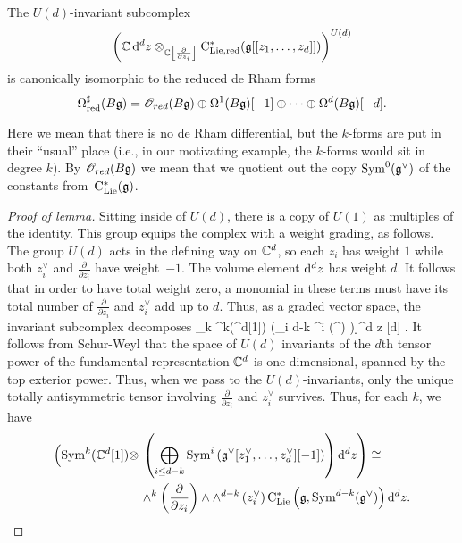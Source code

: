 \begin{lem}
The $U(d)$-invariant subcomplex 
\[
\left( \mathbb C \, {\rm d}^d z \otimes_{\mathbb C\left[\frac{\partial}{\partial z_i}\right]} {\rm C}_{\rm Lie, red}^*(\mathfrak g[[z_1,\ldots,z_d]]) \right)^{U(d)}
\]
is canonically isomorphic to the reduced de Rham forms
\[
\Omega^\sharp_{\rm red}(B\mathfrak g) = \mathscr O_{red}(B \mathfrak g) \oplus \Omega^{1} (B \mathfrak g)[-1] \oplus \cdots \oplus \Omega^{d}(B \mathfrak g)[-d]. 
\]
\end{lem}

Here we mean that there is no de Rham differential, 
but the $k$-forms are put in their ``usual'' place 
(i.e., in our motivating example, the $k$-forms would sit in degree $k$).
By $\mathscr O_{red}(B \mathfrak g)$ we mean that we quotient out the copy ${\rm Sym}^0(\mathfrak g^\vee)$ of the constants from~${\rm C}_{{\rm Lie}}^*(\mathfrak g)$.

\begin{proof}[Proof of lemma]
Sitting inside of $U(d)$, there is a copy of $U(1)$ as multiples of the identity.
This group equips the complex with a weight grading, as follows.
The group $U(d)$ acts in the defining way on $\mathbb C^d$,
so each $z_i$ has weight $1$ while both $z_i^\vee$ and $\frac{\partial}{\partial z_i}$ have weight~$-1$. 
The volume element ${\rm d}^d z$ has weight $d$.
It follows that in order to have total weight zero, a monomial in these terms must have its total number of $\frac{\partial}{\partial z_i}$ and $z_i^\vee$ add up to $d$.
Thus, as a graded vector space, the invariant subcomplex decomposes
\beqn
\bigoplus_{k } \Sym^k(\CC^d[1]) \tensor \left(\bigoplus_{i \leq d-k} \Sym^{i} \left(\fg^ \right) \right) \d^d z [d] .
\eeqn
It follows from Schur-Weyl that the space of $U(d)$ invariants of the $d$th tensor power of the fundamental representation $\mathbb C^d$ is one-dimensional, spanned by the top exterior power. 
Thus, when we pass to the $U(d)$-invariants, only the unique totally antisymmetric tensor involving $\frac{\partial}{\partial z_i}$ and $z_i^\vee$ survives. 
Thus, for each $k$, we have
\begin{align}
\label{U(d) invariants}
\left({\rm Sym}^k(\mathbb C^d[1]) \otimes \right. & \left. \left(\bigoplus_{i \leq d-k} {\rm Sym}^{i} \left(\mathfrak g^\vee [z_1^\vee,\ldots,z_d^\vee][-1] \right) \right) {\rm d}^d z\right) \cong \\ & \wedge^{k}\left(\frac{\partial}{\partial z_i}\right) \wedge \wedge^{d-k}\left(z_i^\vee\right) {\rm C}_{{\rm Lie}}^*\left(\mathfrak g , {\rm Sym}^{d-k}(\mathfrak g^\vee)\right) {\rm d}^d z .
\end{align}

\end{proof}
